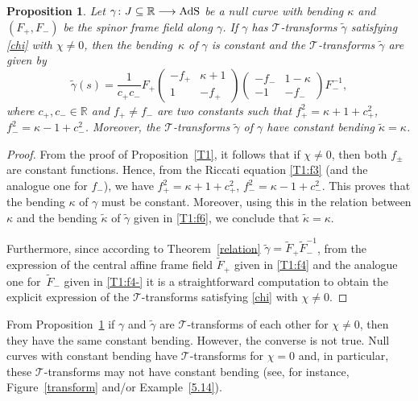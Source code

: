 \documentclass[pdftex]{sigma}
\numberwithin{equation}{section}
\newtheorem{Proposition}[Theorem]{Proposition}
 { \theoremstyle{definition}
\newtheorem{Definition}[Theorem]{Definition}
\newtheorem{Note}[Theorem]{Note}
\newtheorem{Example}[Theorem]{Example}
\newtheorem{Remark}[Theorem]{Remark} }
\def\bending{\kappa}
\def\R{\mathbb{R}}
\def\AdS{{\rm AdS}}
\begin{document}
\begin{Proposition}\label{5.5} Let $\gamma\colon J \subseteq \R\longrightarrow \AdS$ be a null curve with bending $\bending$ and $(F_+,F_-)$ be the spinor frame field along $\gamma$. If $\gamma$ has $\mathcal{T}$-transforms $\widetilde{\gamma}$ satisfying \eqref{chi} with $\chi\neq 0$, then the bending~$\bending$ of $\gamma$ is constant and the $\mathcal{T}$-transforms $\widetilde{\gamma}$ are given by
\begin{equation*}\widetilde{\gamma}(s)=\frac{1}{c_+c_-}F_+\begin{pmatrix}-f_+&\bending+1\\1&-f_+\end{pmatrix}\begin{pmatrix}-f_-&1-\bending\\-1&-f_-\end{pmatrix}F_-^{-1},\end{equation*}
	where $c_+,c_-\in\R$ and $f_+\neq f_-$ are two constants such that
$f_+^2=\bending+1+c_+^2$, $f_-^2=\bending-1+c_-^2$.
Moreover, the $\mathcal{T}$-transforms $\widetilde{\gamma}$ of $\gamma$ have constant bending $\widetilde{\bending}=\bending$.
\end{Proposition}
\begin{proof} From the proof of Proposition~\ref{T1}, it follows that if $\chi\neq 0$, then both $f_{\pm}$ are constant functions. Hence, from the Riccati equation \eqref{T1:f3} (and the analogue one for $f_-$), we have
$f_+^2=\bending+ 1+c_+^2$, $f_-^2=\bending-1+c_-^2$.
	This proves that the bending $\bending$ of $\gamma$ must be constant. Moreover, using this in the relation between $\bending$ and the bending $\widetilde{\bending}$ of $\widetilde{\gamma}$ given in \eqref{T1:f6}, we conclude that $\widetilde{\bending}=\bending$.
	
	Furthermore, since according to Theorem~\ref{relation} $\widetilde{\gamma}=\widetilde{F}_+\widetilde{F}_-^{-1}$,
	from the expression of the central affine frame field $\widetilde{F}_+$ given in \eqref{T1:f4} and the analogue one for~$\widetilde{F}_-$ given in \eqref{T1:f4-} it is a straightforward computation to obtain the explicit expression of the $\mathcal{T}$-transforms satisfying \eqref{chi} with $\chi\neq 0$.
\end{proof}

\begin{Remark} From Proposition~\ref{5.5} if $\gamma$ and $\widetilde{\gamma}$ are $\mathcal{T}$-transforms of each other for $\chi\neq 0$, then they have the same constant bending. However, the converse is not true. Null curves with constant bending have $\mathcal{T}$-transforms for $\chi=0$ and, in particular, these $\mathcal{T}$-transforms may not have constant bending (see, for instance, Figure~\ref{transform} and/or Example~\ref{5.14}).
\end{Remark}
\end{document}
